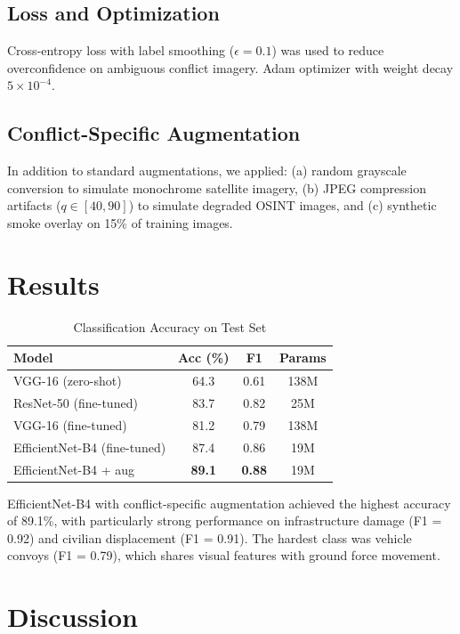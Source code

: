 \documentclass[conference]{IEEEtran}
\begin{document}
\subsection{Loss and Optimization}
Cross-entropy loss with label smoothing ($\epsilon = 0.1$) was used to reduce overconfidence on ambiguous conflict imagery. Adam optimizer with weight decay $5 \times 10^{-4}$.

\subsection{Conflict-Specific Augmentation}
In addition to standard augmentations, we applied: (a) random grayscale conversion to simulate monochrome satellite imagery, (b) JPEG compression artifacts ($q \in [40, 90]$) to simulate degraded OSINT images, and (c) synthetic smoke overlay on 15\% of training images.

\section{Results}

\begin{table}[htbp]
\caption{Classification Accuracy on Test Set}
\begin{center}
\begin{tabular}{|l|c|c|c|}
\hline
\textbf{Model} & \textbf{Acc (\%)} & \textbf{F1} & \textbf{Params} \\
\hline
VGG-16 (zero-shot) & 64.3 & 0.61 & 138M \\
ResNet-50 (fine-tuned) & 83.7 & 0.82 & 25M \\
VGG-16 (fine-tuned) & 81.2 & 0.79 & 138M \\
EfficientNet-B4 (fine-tuned) & 87.4 & 0.86 & 19M \\
EfficientNet-B4 + aug & \textbf{89.1} & \textbf{0.88} & 19M \\
\hline
\end{tabular}
\label{tab:results}
\end{center}
\end{table}

EfficientNet-B4 with conflict-specific augmentation achieved the highest accuracy of 89.1\%, with particularly strong performance on infrastructure damage (F1 = 0.92) and civilian displacement (F1 = 0.91). The hardest class was vehicle convoys (F1 = 0.79), which shares visual features with ground force movement.

\section{Discussion}
\end{document}
